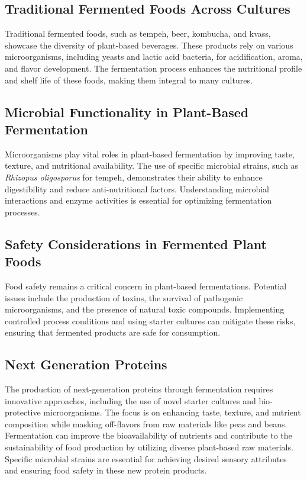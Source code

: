 \subsection{Traditional Fermented Foods Across Cultures} 
Traditional fermented foods, such as tempeh, beer, kombucha, and kvass, showcase the diversity of plant-based beverages. These products rely on various microorganisms, including yeasts and lactic acid bacteria, for acidification, aroma, and flavor development. The fermentation process enhances the nutritional profile and shelf life of these foods, making them integral to many cultures.

\subsection{Microbial Functionality in Plant-Based Fermentation}
Microorganisms play vital roles in plant-based fermentation by improving taste, texture, and nutritional availability. The use of specific microbial strains, such as \textit{Rhizopus oligosporus} for tempeh, demonstrates their ability to enhance digestibility and reduce anti-nutritional factors. Understanding microbial interactions and enzyme activities is essential for optimizing fermentation processes.

\subsection{Safety Considerations in Fermented Plant Foods} 
Food safety remains a critical concern in plant-based fermentations. Potential issues include the production of toxins, the survival of pathogenic microorganisms, and the presence of natural toxic compounds. Implementing controlled process conditions and using starter cultures can mitigate these risks, ensuring that fermented products are safe for consumption.

\subsection{Next Generation Proteins} 
The production of next-generation proteins through fermentation requires innovative approaches, including the use of novel starter cultures and bio-protective microorganisms. The focus is on enhancing taste, texture, and nutrient composition while masking off-flavors from raw materials like peas and beans. Fermentation can improve the bioavailability of nutrients and contribute to the sustainability of food production by utilizing diverse plant-based raw materials. Specific microbial strains are essential for achieving desired sensory attributes and ensuring food safety in these new protein products.
